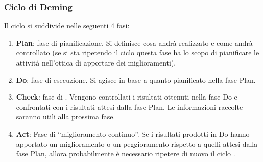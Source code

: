\subsubsection{Ciclo di Deming} \label{App\glossaryItem{PDCA}}
Il ciclo  si suddivide nelle seguenti 4 fasi:
\begin{enumerate}
\item \textbf{Plan}: fase di pianificazione. Si definisce cosa andrà realizzato e come andrà controllato (se si sta ripetendo il ciclo questa fase ha lo scopo di pianificare le attività nell'ottica di apportare dei miglioramenti).
\item \textbf{Do}: fase di esecuzione. Si agisce in base a quanto pianificato nella fase Plan.
\item \textbf{Check}: fase di . Vengono controllati i risultati ottenuti nella fase Do e confrontati con i risultati attesi dalla fase Plan. Le informazioni raccolte saranno utili alla prossima fase.
\item \textbf{Act}: Fase di “miglioramento continuo”. Se i risultati prodotti in Do hanno apportato un miglioramento o un peggioramento rispetto a quelli attesi dalla fase Plan, allora probabilmente è necessario ripetere di nuovo il ciclo .
\end{enumerate}
